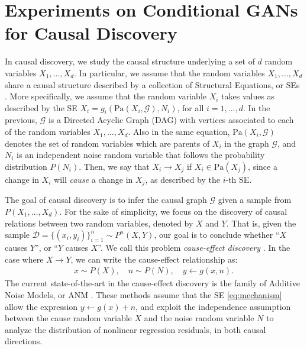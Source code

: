 \documentclass[a4paper]{article}
\begin{document}
  \section{Experiments on Conditional GANs for Causal Discovery}\label{sec:causality}

  In causal discovery, we study the causal structure underlying a set of $d$
  random variables $X_1, \ldots, X_d$. In particular, we assume that the random
  variables $X_1, \ldots, X_d$ share a causal structure described by a
  collection of Structural Equations, or SEs
  \citep{pearl2009causality}.  More specifically, we assume that the random
  variable $X_i$ takes values as described by the SE
  $X_i = g_i(\text{Pa}(X_i, \mathcal{G}), N_i)$,
  for all $i=1,\ldots,d$. In the previous, $\mathcal{G}$ is a Directed Acyclic
  Graph (DAG) with vertices associated to each of the random variables $X_1,
  \ldots, X_d$.  Also in the same equation, $\text{Pa}(X_i, \mathcal{G})$
  denotes the set of random variables which are parents of $X_i$ in the graph
  $\mathcal{G}$, and $N_i$ is an independent noise random variable that
  follows the probability distribution $P(N_i)$. Then, we say that $X_i \to X_j$
  if $X_i \in \text{Pa}(X_j)$, since a change in $X_i$ will \emph{cause} a change in $X_j$,
  as described by the $i$-th SE.

  The goal of causal discovery is to infer the causal graph $\mathcal{G}$ given
  a sample from $P(X_1, \ldots, X_d)$. For
  the sake of simplicity, we focus on the discovery of causal relations
  between two random variables, denoted by $X$ and $Y$. That is, given the sample
  $\mathcal{D} = \{(x_i,y_i)\}_{i=1}^n \sim P^n(X,Y)$, our goal is to
  conclude whether ``$X$ causes $Y$'', or ``$Y$
  causes $X$''. We call this problem \emph{cause-effect discovery}
  \citep{mooij2014distinguishing}. In the case where $X \to Y$, we can write
  the cause-effect relationship as:
  \begin{align}
    x \sim P(X),\quad
    n \sim P(N),\quad
    y \leftarrow g(x,n).\label{eq:mechanism}
  \end{align}
  The current state-of-the-art in the cause-effect discovery is the family of
  Additive Noise Models, or ANM \citep{mooij2014distinguishing}. These methods
  assume that the SE \eqref{eq:mechanism} allow the
  expression $y \leftarrow g(x)+n$, and exploit the independence assumption
  between the cause random variable $X$ and the noise random variable $N$ to
  analyze the distribution of nonlinear regression residuals, in both
  causal directions.
\end{document}
